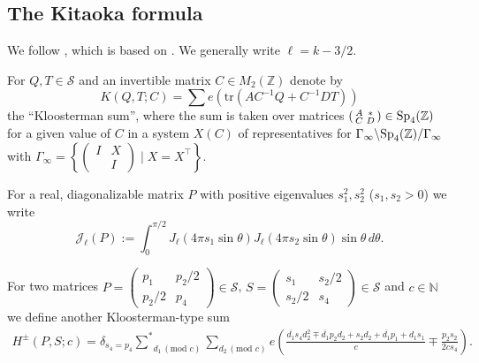 \documentclass[11pt]{amsart}
\numberwithin{equation}{section}
\theoremstyle{plain}
\theoremstyle{definition}
\numberwithin{equation}{section}
\begin{document}
\subsection{The Kitaoka formula}

We follow \cite{Bl}, which is based on \cite{Ki}.  We generally write $\ell = k - 3/2$. 

For $Q, T \in \mathcal{S}$ and an invertible matrix $C \in M_2(\mathbb{Z})$ denote by 
\begin{equation}\label{klooster}
K(Q, T; C) = \sum e\left(\text{tr}(A C^{-1} Q + C^{-1} D T)\right)
\end{equation}
the ``Kloosterman sum'', where the sum is taken over matrices $\left(\begin{smallmatrix} A & \ast \\ C & D\end{smallmatrix}\right) \in {\rm Sp}_4( \mathbb{Z})$ for a given value of $C$ in a system $X(C)$ of representatives for $\Gamma_{\infty} \backslash {\rm Sp}_4( \mathbb{Z}) /\Gamma_{\infty}$ with $\Gamma_{\infty} = \left\{ \left(\begin{smallmatrix} I & X \\  & I\end{smallmatrix}\right)  \mid X = X^{\top}\right\}.$  

For a real, diagonalizable matrix $P$ with positive eigenvalues $s_1^2, s_2^2$ ($s_1, s_2 > 0$) we write 
\begin{equation}\label{defJ}
    \mathcal{J}_{\ell}(P) := \int_0^{\pi/2} J_{\ell}(4\pi s_1 \sin \theta)J_{\ell}(4\pi s_2 \sin \theta)\sin\theta\, d\theta. 
    \end{equation}

For two matrices $P = \left(\begin{smallmatrix} p_1& p_2/2\\ p_2/2 & p_4\end{smallmatrix}\right) \in \mathcal{S}$, $S = \left(\begin{smallmatrix} s_1& s_2/2\\ s_2/2 & s_4\end{smallmatrix}\right) \in \mathcal{S}$ and $c \in \mathbb{N}$ we define another Kloosterman-type sum
\begin{align} \label{Hkloos}
H^{\pm}(P, S; c) =  \delta_{s_4 = p_4} \underset{d_1 \, (\text{mod }c)}{\left.\sum\right.^{\ast}} \sum_{d_2 \, (\text{mod }c)} e \left( \frac{\overline{d_1} s_4 d_2^2 \mp \overline{d_1} p_2d_2 + s_2d_2 + \overline{d_1}p_1 + d_1 s_1 }{c} \mp \frac{p_2s_2}{2 cs_4}\right).
\end{align}
 
\end{document}
